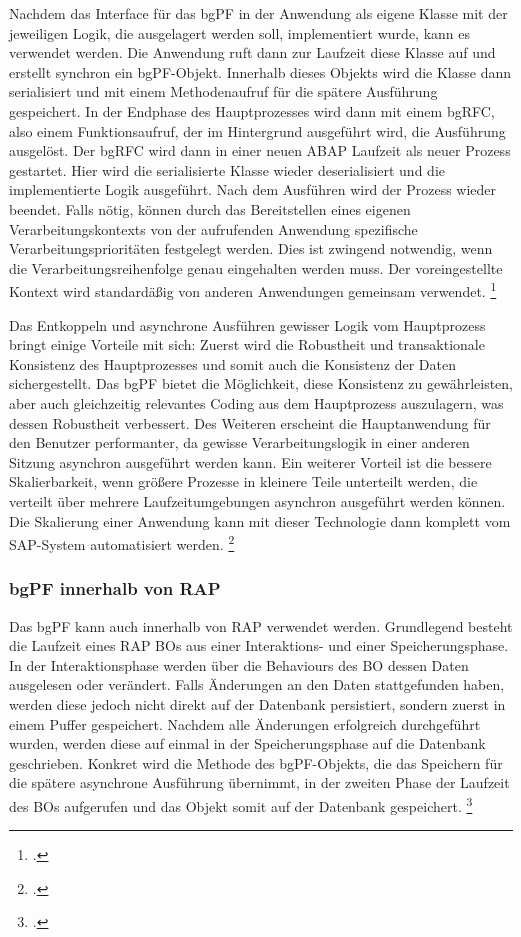 Nachdem das Interface für das bgPF in der Anwendung als eigene Klasse mit der jeweiligen Logik, die ausgelagert werden soll, implementiert wurde, kann es verwendet werden. Die Anwendung ruft dann zur Laufzeit diese Klasse auf und erstellt synchron ein bgPF-Objekt. Innerhalb dieses Objekts wird die Klasse dann serialisiert und mit einem Methodenaufruf für die spätere Ausführung gespeichert. In der Endphase des Hauptprozesses wird dann mit einem bgRFC, also einem Funktionsaufruf, der im Hintergrund ausgeführt wird, die Ausführung ausgelöst. Der bgRFC wird dann in einer neuen ABAP Laufzeit als neuer Prozess gestartet. Hier wird die serialisierte Klasse wieder deserialisiert und die implementierte Logik ausgeführt. Nach dem Ausführen wird der Prozess wieder beendet. Falls nötig, können durch das Bereitstellen eines eigenen Verarbeitungskontexts von der aufrufenden Anwendung spezifische Verarbeitungsprioritäten festgelegt werden. Dies ist zwingend notwendig, wenn die Verarbeitungsreihenfolge genau eingehalten werden muss. Der voreingestellte Kontext wird standardä{\ss}ig von anderen Anwendungen gemeinsam verwendet. \footcite[Vgl.][]{sap_bgpf_2023}

Das Entkoppeln und asynchrone Ausführen gewisser Logik vom Hauptprozess bringt einige Vorteile mit sich: Zuerst wird die Robustheit und transaktionale Konsistenz des Hauptprozesses und somit auch die Konsistenz der Daten sichergestellt. Das bgPF bietet die Möglichkeit, diese Konsistenz zu gewährleisten, aber auch gleichzeitig relevantes Coding aus dem Hauptprozess auszulagern, was dessen Robustheit verbessert. Des Weiteren erscheint die Hauptanwendung für den Benutzer performanter, da gewisse Verarbeitungslogik in einer anderen Sitzung asynchron ausgeführt werden kann. Ein weiterer Vorteil ist die bessere Skalierbarkeit, wenn grö{\ss}ere Prozesse in kleinere Teile unterteilt werden, die verteilt über mehrere Laufzeitumgebungen asynchron ausgeführt werden können. Die Skalierung einer Anwendung kann mit dieser Technologie dann komplett vom SAP-System automatisiert werden. \footcite[Vgl.][]{sap_bgpf_2023}

\subsubsection{bgPF innerhalb von RAP}

Das bgPF kann auch innerhalb von RAP verwendet werden. Grundlegend besteht die Laufzeit eines RAP BOs aus einer Interaktions- und einer Speicherungsphase. In der Interaktionsphase werden über die Behaviours des BO dessen Daten ausgelesen oder verändert. Falls Änderungen an den Daten stattgefunden haben, werden diese jedoch nicht direkt auf der Datenbank persistiert, sondern zuerst in einem Puffer gespeichert. Nachdem alle Änderungen erfolgreich durchgeführt wurden, werden diese auf einmal in der Speicherungsphase auf die Datenbank geschrieben. Konkret wird die Methode des bgPF-Objekts, die das Speichern für die spätere asynchrone Ausführung übernimmt, in der zweiten Phase der Laufzeit des BOs aufgerufen und das Objekt somit auf der Datenbank gespeichert. \footcite[Vgl.][]{sap_bgpf_2023}

